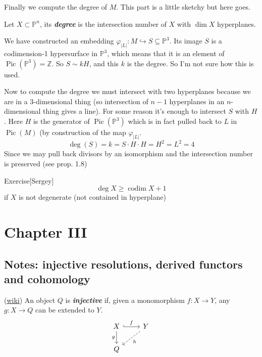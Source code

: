Finally we compute the degree of $M$. {\color{6}This part is a little sketchy} but here goes.

\begin{defn}\leavevmode
	Let $X\subset \mathbb{P}^n$, its \textit{\textbf{degree}} is the intersection number of $X$ with $\dim X$ hyperplanes.
\end{defn}

We have constructed an embedding $\varphi_{|L|}:M\hookrightarrow S\subseteq \mathbb{P}^3$. Its image $S$ is a codimension-1 hypersurface in $\mathbb{P}^3$, which means that it is an element  of  $\operatorname{Pic}(\mathbb{P}^3) =\mathbb{Z}$. So $S \sim kH$, and this $k$ is the degree. {\color{6}So I'm not sure how this is used.}

Now to compute the degree we must intersect with two hyperplanes because we are in a 3-dimensional thing (so intersection of $n-1$ hyperplanes in an  $ n$-dimensional thing gives a line). {\color{6}For some reason} it's enough to intersect $S$ with $H$. Here $H$ is the generator of $\operatorname{Pic}(\mathbb{P}^3)$ which is in fact pulled back to $L$ in $\operatorname{Pic}(M)$ (by construction of the map $\varphi_{|L|}$.
\[\operatorname{deg}(S)=k=S\cdot H\cdot H=H^2=L^2=4\]
Since we may pull back divisors by an isomorphism and the intersection number is preserved (see \cite{beauville} prop. 1.8)

\begin{thing5}{Exercise}[Sergey]\leavevmode
	\[\operatorname{deg}X\geq \operatorname{codim}X+1\]
	if $X$ is not degenerate (not contained in hyperplane)
\end{thing5}


\chapter{Chapter III}

\section{Notes: injective resolutions, derived functors and cohomology}
\begin{defn}
	(\href{https://en.wikipedia.org/wiki/Injective_object#:~:text=9%20References-,Definition,can%20be%20extended%20to%20Y%20.}{wiki}) An object $Q$ is \textit{\textbf{injective}} if, given a monomorphism $f:X\to Y$, any $g:X\to Q$ can be extended to $Y$.
\[\begin{tikzcd}
X\arrow[r,"f",hook]\arrow[d,"g",swap]&Y\arrow[dl,"h",dashed]\\
Q
\end{tikzcd}\]
\end{defn}

